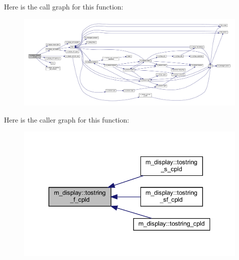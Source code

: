 Here is the call graph for this function\+:
\nopagebreak
\begin{figure}[H]
\begin{center}
\leavevmode
\includegraphics[width=350pt]{namespacem__display_a7bab74c992649c74c27fe924c235e448_cgraph}
\end{center}
\end{figure}
Here is the caller graph for this function\+:
\nopagebreak
\begin{figure}[H]
\begin{center}
\leavevmode
\includegraphics[width=337pt]{namespacem__display_a7bab74c992649c74c27fe924c235e448_icgraph}
\end{center}
\end{figure}
\mbox{\label{namespacem__display_af19de6a6efe76fa3dc9bd86a33f9321b}} 
